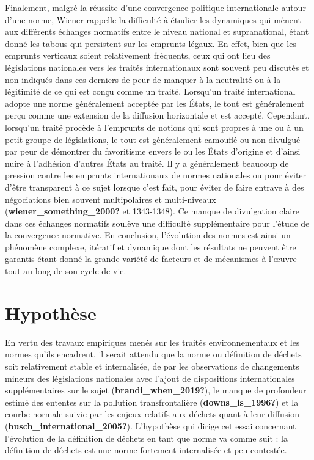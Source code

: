 \documentclass[12pt]{ulaval}
\begin{document}
Finalement, malgré la réussite d'une convergence politique internationale autour d'une norme, Wiener rappelle la difficulté à étudier les dynamiques qui mènent aux différents échanges normatifs entre le niveau national et supranational, étant donné les tabous qui persistent sur les emprunts légaux. En effet, bien que les emprunts verticaux soient relativement fréquents, ceux qui ont lieu des législations nationales vers les traités internationaux sont souvent peu discutés et non indiqués dans ces derniers de peur de manquer à la neutralité ou à la légitimité de ce qui est conçu comme un traité. Lorsqu'un traité international adopte une norme généralement acceptée par les États, le tout est généralement perçu comme une extension de la diffusion horizontale et est accepté. Cependant, lorsqu'un traité procède à l'emprunts de notions qui sont propres à une ou à un petit groupe de législations, le tout est généralement camouflé ou non divulgué par peur de démontrer du favoritisme envers le ou les États d'origine et d'ainsi nuire à l'adhésion d'autres États au traité. Il y a généralement beaucoup de pression contre les emprunts internationaux de normes nationales ou pour éviter d'être transparent à ce sujet lorsque c'est fait, pour éviter de faire entrave à des négociations bien souvent multipolaires et multi-niveaux (\textbf{wiener\_something\_2000?} et 1343-1348). Ce manque de divulgation claire dans ces échanges normatifs soulève une difficulté supplémentaire pour l'étude de la convergence normative. En conclusion, l'évolution des normes est ainsi un phénomène complexe, itératif et dynamique dont les résultats ne peuvent être garantis étant donné la grande variété de facteurs et de mécanismes à l'œuvre tout au long de son cycle de vie.

\section{Hypothèse}\label{hypothuxe8se}

En vertu des travaux empiriques menés sur les traités environnementaux et les normes qu'ils encadrent, il serait attendu que la norme ou définition de déchets soit relativement stable et internalisée, de par les observations de changements mineurs des législations nationales avec l'ajout de dispositions internationales supplémentaires sur le sujet (\textbf{brandi\_when\_2019?}), le manque de profondeur estimé des ententes sur la pollution transfrontalière (\textbf{downs\_is\_1996?}) et la courbe normale suivie par les enjeux relatifs aux déchets quant à leur diffusion (\textbf{busch\_international\_2005?}). L'hypothèse qui dirige cet essai concernant l'évolution de la définition de déchets en tant que norme va comme suit : la définition de déchets est une norme fortement internalisée et peu contestée.
\end{document}
